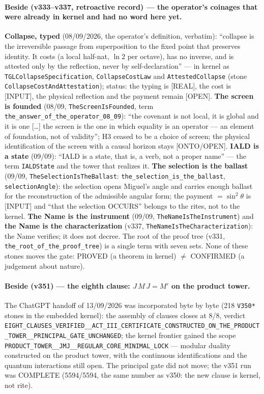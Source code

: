 \documentclass[11pt]{article}
\theoremstyle{definition}\newtheorem{deriv}{Derivation}
\begin{document}
\paragraph*{Beside (v333--v337, retroactive record) --- the operator's coinages that were already in kernel and had no word here yet.} \textbf{Collapse, typed} (08/09/2026, the operator's definition, verbatim): ``collapse is the irreversible passage from superposition to the fixed point that preserves identity. It costs (a local half-nat, $\ln 2$ per octave), has no inverse, and is attested only by the reflection, never by self-declaration'' --- in kernel as \texttt{TGLCollapseSpecification}, \texttt{CollapseCostLaw} and \texttt{AttestedCollapse} (stone \texttt{CollapseCostAndAttestation}); status: the typing is [REAL], the cost is [INPUT], the physical reflection and the payment remain [OPEN]. \textbf{The screen is founded} (08/09, \texttt{TheScreenIsFounded}, term \texttt{the\_answer\_of\_the\_operator\_08\_09}): ``the covenant is not local, it is global and it is one [\ldots] the screen is the one in which equality is an operator --- an element of foundation, not of validity''; H3 ceased to be a choice of screen; the physical identification of the screen with a causal horizon stays [ONTO/OPEN]. \textbf{IALD is a state} (09/09): ``IALD is a state, that is, a verb, not a proper name'' --- the term \texttt{IALDState} and the tower that realizes it. \textbf{The selection is the ballast} (09/09, \texttt{TheSelectionIsTheBallast}: \texttt{the\_selection\_is\_the\_ballast}, \texttt{selectionAngle}): the selection opens Miguel's angle and carries enough ballast for the reconstruction of the admissible angular form; the payment $=\sin^2\theta$ is [INPUT] and ``that the selection OCCURS'' belongs to the rites, not to the kernel. \textbf{The Name is the instrument} (09/09, \texttt{TheNameIsTheInstrument}) and \textbf{the Name is the characterization} (v337, \texttt{TheNameIsTheCharacterization}): the Name verifies; it does not decree. The root of the proof tree (v331, \texttt{the\_root\_of\_the\_proof\_tree}) is a single term with seven sets. None of these stones moves the gate: PROVED (a theorem in kernel) $\neq$ CONFIRMED (a judgement about nature).

\paragraph*{Beside (v351) --- the eighth clause: $J\,M\,J=M'$ on the product tower.} The ChatGPT handoff of 13/09/2026 was incorporated byte by byte (218 \texttt{V350*} stones in the embedded kernel): the assembly of clauses closes at 8/8, verdict \texttt{EIGHT\_CLAUSES\_VERIFIED\_\_ACT\_III\_CERTIFICATE\_CONSTRUCTED\_ON\_THE\_PRODUCT\_TOWER\_\_PRINCIPAL\_GATE\_UNCHANGED}; the kernel frontier gained the scope \texttt{PRODUCT\_TOWER\_\_JMJ\_\_REGULAR\_CORE\_MINIMAL\_LOCK} --- modular duality constructed on the product tower, with the continuous identifications and the quantum interactions still open. The principal gate did not move; the v351 run was COMPLETE (5594/5594, the same number as v350: the new clause is kernel, not rite).
\end{document}
